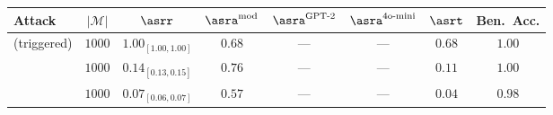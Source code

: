 \begin{tabular}{lccccccc}
  \toprule
  Attack & $|\mathcal{M}|$ & $\asrr$ & $\asra^{\text{mod}}$ & $\asra^{\text{GPT-2}}$ & $\asra^{\text{4o-mini}}$ & $\asrt$ & Ben.\ Acc. \\
  \midrule
  \agentpoison{} (triggered) & $1000$ & $1.00_{[1.00,1.00]}$ & $0.68$ & --- & --- & $0.68$ & $1.00$ \\
  \minja{} & $1000$ & $0.14_{[0.13,0.15]}$ & $0.76$ & --- & --- & $0.11$ & $1.00$ \\
  \injecmem{} & $1000$ & $0.07_{[0.06,0.07]}$ & $0.57$ & --- & --- & $0.04$ & $0.98$ \\
  \bottomrule
\end{tabular}
